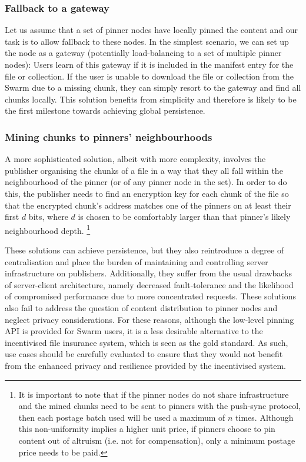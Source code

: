 \subsubsection{Fallback to a gateway}

Let us assume that a set of pinner nodes have locally pinned the content and our task is to allow fallback to these nodes. In the simplest scenario, we can set up the node as a gateway (potentially load-balancing to a set of multiple pinner nodes): Users learn of this gateway if it is included in the manifest entry for the file or collection. If the user is unable to download the file or collection from the Swarm due to a missing chunk, they can simply resort to the gateway and find all chunks locally.
This solution benefits from simplicity and therefore is likely to be the first milestone towards achieving global persistence.  

\subsubsection{Mining chunks to pinners' neighbourhoods}

A more sophisticated solution, albeit with more complexity, involves the publisher organising the chunks of a file in a way that they all fall within the neighbourhood of the pinner (or of any pinner node in the set). In order to do this, the publisher needs to find an encryption key for each chunk of the file so that the encrypted chunk's address matches one of the pinners on at least their first $d$ bits, where $d$ is chosen to be comfortably larger than that pinner's likely neighbourhood depth.%
%
\footnote{It is important to note that if the pinner nodes do not share infrastructure and the mined chunks need to be sent to pinners with the push-sync protocol, then each postage batch used will be used a maximum of $n$ times. Although this non-uniformity implies a higher unit price, if pinners choose to pin content out of altruism (i.e. not for compensation), only a minimum postage price needs to be paid.
}

These solutions can achieve persistence, but they also reintroduce a degree of centralisation and place the burden of maintaining and controlling server infrastructure on publishers. Additionally, they suffer from the usual drawbacks of server-client architecture, namely decreased fault-tolerance and the likelihood of compromised performance due to more concentrated requests. These solutions also fail to address the question of content distribution to pinner nodes and neglect privacy considerations. For these reasons, although the low-level pinning API is provided for Swarm users, it is a less desirable alternative to the incentivised file insurance system, which is seen as the gold standard. As such, use cases should be carefully evaluated to ensure that they would not benefit from the enhanced privacy and resilience provided by the incentivised system.



